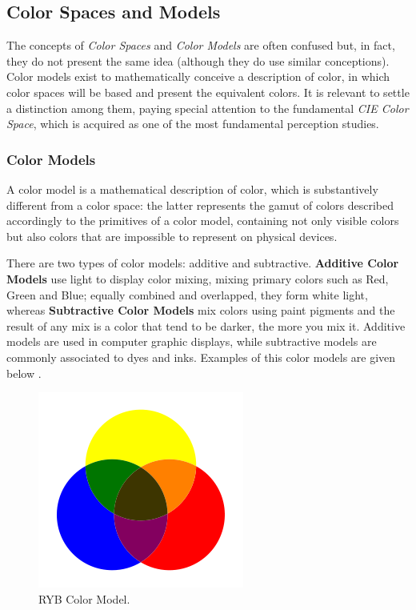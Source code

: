 \documentclass{report}
\begin{document}
\subsection{Color Spaces and Models}
The concepts of \emph{Color Spaces} and \emph{Color Models} are often confused but, in fact, they do not present the same idea
(although they do use similar conceptions). Color models exist to mathematically conceive a description of color,
in which color spaces will be based and present the equivalent colors. It is relevant to settle a distinction among
them, paying special attention to the fundamental \emph{CIE Color Space}, which is acquired as one of the most
fundamental perception studies.  
%
\subsubsection{Color Models}
A color model is a mathematical description of color, which is substantively different from a color space: the latter represents
the gamut of colors described accordingly to the primitives of a color model, containing not only visible colors
but also colors that are impossible to represent on physical devices. \par
There are two types of color models: additive and subtractive. \textbf{Additive Color Models} use light
to display color mixing, mixing primary colors such as Red, Green and Blue; equally combined and 
overlapped, they form white light, whereas \textbf{Subtractive Color Models} mix colors using paint pigments
and the result of any mix is a color that tend to be darker, the more you mix it. Additive models are used
in computer graphic displays, while subtractive models are commonly associated to dyes and inks. Examples
of this color models are given below \cite{Ware2012}. \par
%
\begin{figure}
  \centering
  \vspace{-2\baselineskip}
  \includegraphics[width=\linewidth]{RYB.png}
  \caption[RYB Color Model Schematic]{RYB Color Model.\protect\footnotemark{}}	
  \label{fig:RYB}
\end{figure}
\end{document}
